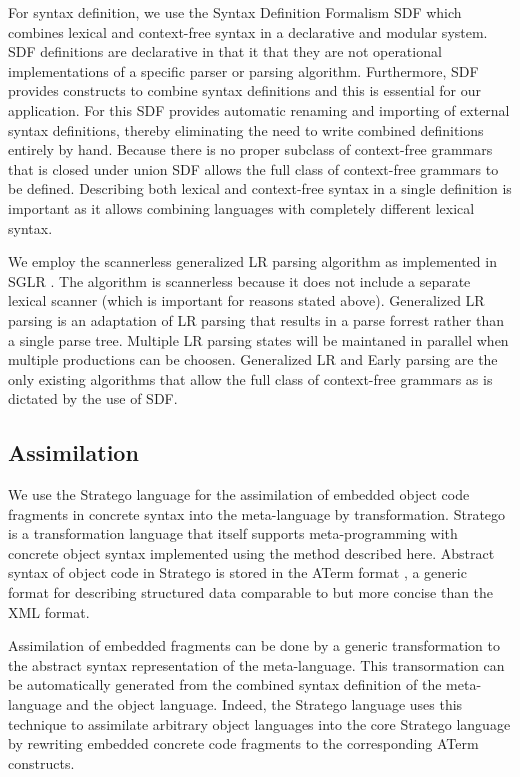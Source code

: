 \documentclass[a4paper,11pt]{article}
\begin{document}
For syntax definition, we use the Syntax Definition Formalism SDF \cite{Brand02, Visser97b} which combines
lexical and context-free syntax in a declarative and modular system. SDF definitions
are declarative in that it that they are not operational implementations of a
specific parser or parsing algorithm. Furthermore, SDF provides constructs to
combine syntax definitions and this is essential for our application. For this SDF
provides automatic renaming and importing of external syntax definitions, thereby
eliminating the need to write combined definitions entirely by hand. Because
there is no proper subclass of context-free grammars that is closed under union
SDF allows the full class of context-free grammars to be defined. Describing
both lexical and context-free syntax in a single definition is important as it
allows combining languages with completely different lexical syntax.

We employ the scannerless generalized LR parsing algorithm as implemented in
SGLR \cite{Visser97}. The algorithm is scannerless because it does not include a separate lexical
scanner (which is important for reasons stated above). Generalized LR parsing is
an adaptation of LR parsing that results in a parse forrest rather than a single
parse tree. Multiple LR parsing states will be maintaned in parallel when multiple
productions can be choosen. Generalized LR and Early parsing are the only existing
algorithms that allow the full class of context-free grammars as is dictated by
the use of SDF.


\subsection{Assimilation}

We use the Stratego language for the assimilation of embedded object code fragments
in concrete syntax into the meta-language by transformation. Stratego is a
transformation language that itself supports meta-programming with concrete object
syntax implemented using the method described here. Abstract syntax of object code
in Stratego is stored in the ATerm format \cite{Brand00}, a generic format for describing
structured data comparable to but more concise than the XML format.

Assimilation of embedded fragments can be done by a generic transformation to the
abstract syntax representation of the meta-language. This transormation can be
automatically generated from the combined syntax definition of the meta-language
and the object language. Indeed, the Stratego language uses this technique to
assimilate arbitrary object languages into the core Stratego language by rewriting
embedded concrete code fragments to the corresponding ATerm constructs.
\end{document}
